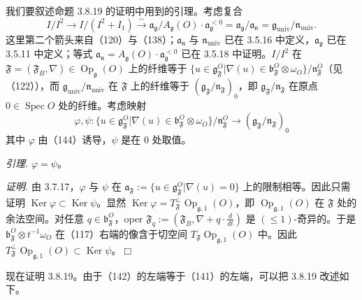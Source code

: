  我们要叙述命题 3.8.19 的证明中用到的引理。考虑复合
\begin{equation}\tag{144}
  I/I^{2}\to I/(I^{2}+I_{1})\xrightarrow{\sim}\mathfrak{a}_{\mathfrak{g}}/A_{\mathfrak{g}}(O)\cdot\mathfrak{a}_{\mathfrak{g}}^{<0}
  =\mathfrak{a}_{\mathfrak{g}}/\mathfrak{a}_{\mathfrak{n}}=\mathfrak{g}_{\mathrm{univ}}/\mathfrak{n}_{\mathrm{univ}}.
\end{equation}
这里第二个箭头来自（120）与（138）；$\mathfrak{a}_{\mathfrak{n}}$ 与 $\mathfrak{n}_{\mathrm{univ}}$ 已在 3.5.16 中定义，$\mathfrak{a}_{\mathfrak{g}}$ 已在 3.5.11 中定义；等式 $\mathfrak{a}_{\mathfrak{n}}=A_{\mathfrak{g}}(O)\cdot\mathfrak{a}_{\mathfrak{g}}^{<0}$ 已在 3.5.18 中证明。$I/I^{2}$ 在 $\mathfrak{F}=(\mathfrak{F}_{B},\nabla)\in\operatorname{Op}_{\mathfrak{g}}(O)$ 上的纤维等于 $\{u\in\mathfrak{g}^{O}_{\mathfrak{F}}|\nabla(u)\in\mathfrak{b}^{O}_{\mathfrak{F}}\otimes\omega_{O}\}/\mathfrak{n}^{O}_{\mathfrak{F}}$（见（122）），而 $\mathfrak{g}_{\mathrm{univ}}/\mathfrak{n}_{\mathrm{univ}}$ 在 $\mathfrak{F}$ 上的纤维等于 $(\mathfrak{g}_{\mathfrak{F}}/\mathfrak{n}_{\mathfrak{F}})_{0}$，即 $\mathfrak{g}_{\mathfrak{F}}/\mathfrak{n}_{\mathfrak{F}}$ 在原点 $0\in\operatorname{Spec}O$ 处的纤维。考虑映射
\[
\varphi,\psi:\{u\in\mathfrak{g}^{O}_{\mathfrak{F}}|\nabla(u)\in\mathfrak{b}^{O}_{\mathfrak{F}}\otimes\omega_{O}\}/\mathfrak{n}^{O}_{\mathfrak{F}}
  \to(\mathfrak{g}_{\mathfrak{F}}/\mathfrak{n}_{\mathfrak{F}})_{0}
\]
其中 $\varphi$ 由（144）诱导，$\psi$ 是在 $0$ 处取值。

 \emph{引理.} $\varphi=\psi$。

\emph{证明.} 由 3.7.17，$\varphi$ 与 $\psi$ 在 $\mathfrak{a}_{\mathfrak{F}}:=\{u\in\mathfrak{g}^{O}_{\mathfrak{F}}|\nabla(u)=0\}$ 上的限制相等。因此只需证明 $\operatorname{Ker}\varphi\subset\operatorname{Ker}\psi$。显然 $\operatorname{Ker}\varphi=T^{\perp}_{\mathfrak{F}}\operatorname{Op}_{\mathfrak{g},1}(O)$，即 $\operatorname{Op}_{\mathfrak{g},1}(O)$ 在 $\mathfrak{F}$ 处的余法空间。对任意 $q\in\mathfrak{b}^{O}_{\mathfrak{F}}$，oper $\mathfrak{F}_{q}:=(\mathfrak{F}_{B},\nabla+q\cdot\frac{d}{dt})$ 是 $(\le 1)$-奇异的。于是 $\mathfrak{b}^{O}_{\mathfrak{F}}\otimes t^{-1}\omega_{O}$ 在（117）右端的像含于切空间 $T_{\mathfrak{F}}\operatorname{Op}_{\mathfrak{g},1}(O)$ 中。因此 $T^{\perp}_{\mathfrak{F}}\operatorname{Op}_{\mathfrak{g},1}(O)\subset\operatorname{Ker}\psi$。\hfill$\Box$

 现在证明 3.8.19。由于（142）的左端等于（141）的左端，可以把 3.8.19 改述如下。

